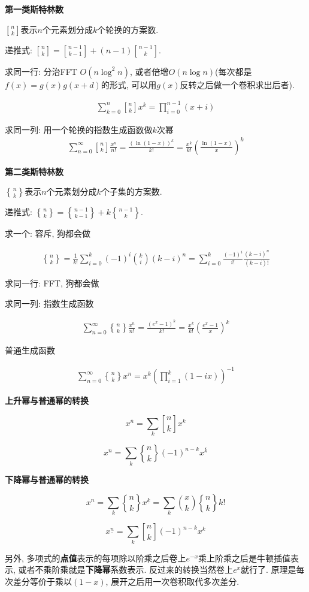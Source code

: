 \textbf{第一类斯特林数}

$n\brack k$表示$n$个元素划分成$k$个轮换的方案数.

递推式: ${n \brack k} = {n-1 \brack k-1} + (n-1){n-1 \brack k}$.

求同一行: 分治FFT $O(n\log ^2 n)$, 或者倍增$O(n\log n)$(每次都是$f(x) = g(x) g(x + d)$的形式, 可以用$g(x)$反转之后做一个卷积求出后者).

$$ \begin{aligned} \sum_{k = 0} ^ n {n \brack k} x^k = \prod_{i = 0} ^ {n - 1} (x + i) \end{aligned} $$

求同一列: 用一个轮换的指数生成函数做$k$次幂
$$\begin{aligned} \sum_{n = 0} ^ \infty {n \brack k} \frac {x ^ n} {n!} = \frac {\left(\ln (1 - x)\right) ^ k} {k!} = \frac {x ^ k} {k!} \left( \frac {\ln (1 - x)} x \right) ^ k \end{aligned}$$

\textbf{第二类斯特林数}

$n\brace k$表示$n$个元素划分成$k$个子集的方案数.

递推式: ${n \brace k} = {n-1 \brace k-1} + k{n-1 \brace k}$.

求一个: 容斥, 狗都会做

$$\begin{aligned} {n \brace k} = \frac 1 {k!} \sum_{i = 0} ^ k (-1) ^ i {k \choose i} (k - i) ^ n = \sum_{i = 0} ^ k \frac {(-1) ^ i} {i!} \frac {(k - i) ^ n} {(k - i)!} \end{aligned}$$

求同一行: FFT, 狗都会做

求同一列: 指数生成函数

$$\begin{aligned} \sum_{n = 0} ^ \infty {n \brace k} \frac {x ^ n} {n!} = \frac {\left(e ^ x - 1\right) ^ k} {k!} = \frac {x ^ k} {k!} \left( \frac {e ^ x - 1} x \right) ^ k \end{aligned}$$

普通生成函数

$$\begin{aligned} \sum_{n = 0} ^ \infty {n \brace k} x ^ n = x ^ k \left(\prod_{i = 1} ^ k (1 - i x)\right) ^ {-1} \end{aligned}$$

\textbf{上升幂与普通幂的转换}

$$ x^{\overline{n}}=\sum_{k} {n \brack k} x^k $$

$$ x^n=\sum_{k} {n \brace k} (-1)^{n-k} x^{\overline{k}} $$

\textbf{下降幂与普通幂的转换}

$$ x^n=\sum_{k} {n \brace k} x^{\underline{k}} = \sum_{k} {x \choose k} {n \brace k} k! $$

$$ x^{\underline{n}}=\sum_{k} {n \brack k} (-1)^{n-k} x^k $$

另外, 多项式的\textbf{点值}表示的每项除以阶乘之后卷上$e^{-x}$乘上阶乘之后是牛顿插值表示, 或者不乘阶乘就是\textbf{下降幂}系数表示. 反过来的转换当然卷上$e^x$就行了. 原理是每次差分等价于乘以$(1 - x)$, 展开之后用一次卷积取代多次差分.